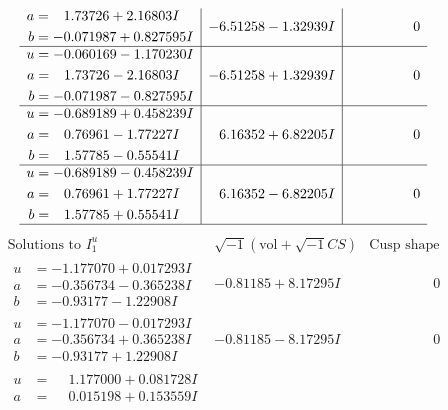 \documentclass[1p]{elsarticle_modified}
\theoremstyle{definition}
\newcommand{\I}{\sqrt{-1}}
\begin{document}
$$\begin{array}{c|c|c}
\begin{aligned}
a &= \phantom{-}1.73726 + 2.16803 I \\
b &= -0.071987 + 0.827595 I\end{aligned}
 & -6.51258 - 1.32939 I & \phantom{-0.000000 } 0 \\ \hline\begin{aligned}
u &= -0.060169 - 1.170230 I \\
a &= \phantom{-}1.73726 - 2.16803 I \\
b &= -0.071987 - 0.827595 I\end{aligned}
 & -6.51258 + 1.32939 I & \phantom{-0.000000 } 0 \\ \hline\begin{aligned}
u &= -0.689189 + 0.458239 I \\
a &= \phantom{-}0.76961 - 1.77227 I \\
b &= \phantom{-}1.57785 - 0.55541 I\end{aligned}
 & \phantom{-}6.16352 + 6.82205 I & \phantom{-0.000000 } 0 \\ \hline\begin{aligned}
u &= -0.689189 - 0.458239 I \\
a &= \phantom{-}0.76961 + 1.77227 I \\
b &= \phantom{-}1.57785 + 0.55541 I\end{aligned}
 & \phantom{-}6.16352 - 6.82205 I & \phantom{-0.000000 } 0\\
 \hline 
 \end{array}$$\newpage$$\begin{array}{c|c|c}  
\text{Solutions to }I^u_{1}& \I (\text{vol} + \sqrt{-1}CS) & \text{Cusp shape}\\
 \hline 
\begin{aligned}
u &= -1.177070 + 0.017293 I \\
a &= -0.356734 - 0.365238 I \\
b &= -0.93177 - 1.22908 I\end{aligned}
 & -0.81185 + 8.17295 I & \phantom{-0.000000 } 0 \\ \hline\begin{aligned}
u &= -1.177070 - 0.017293 I \\
a &= -0.356734 + 0.365238 I \\
b &= -0.93177 + 1.22908 I\end{aligned}
 & -0.81185 - 8.17295 I & \phantom{-0.000000 } 0 \\ \hline\begin{aligned}
u &= \phantom{-}1.177000 + 0.081728 I \\
a &= \phantom{-}0.015198 + 0.153559 I \\

\end{aligned}
\end{array}$$
\end{document}
